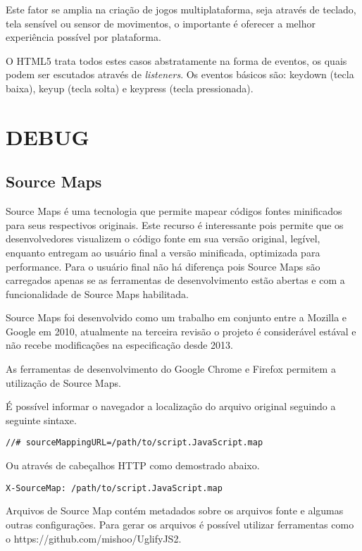 Este fator se amplia na criação de jogos multiplataforma,
seja através de teclado, tela sensível ou sensor de movimentos, o
importante é oferecer a melhor experiência possível por plataforma.

O HTML5 trata todos estes casos abstratamente na forma de eventos, os
quais podem ser escutados através de \textit{listeners}. Os eventos
básicos são: keydown (tecla baixa), keyup (tecla solta) e keypress
(tecla pressionada).
\section{DEBUG}

\subsection{Source Maps}

Source Maps é uma tecnologia que permite mapear códigos fontes
minificados para seus respectivos originais. Este recurso é
interessante pois permite que os desenvolvedores visualizem o código
fonte em sua versão original, legível, enquanto entregam ao usuário
final a versão minificada, optimizada para performance.
Para o usuário final não há diferença pois Source Maps são
carregados apenas se as ferramentas de desenvolvimento estão abertas e
com a funcionalidade de Source Maps habilitada.

Source Maps foi desenvolvido como um trabalho em conjunto entre a
Mozilla e Google em 2010, atualmente na terceira revisão o projeto é
considerável estával e não recebe modificações na especificação
desde 2013.

As ferramentas de desenvolvimento do Google Chrome e Firefox permitem a utilização de Source Maps.

É possível informar o navegador a localização do arquivo original seguindo a seguinte sintaxe.

\begin{verbatim}
//# sourceMappingURL=/path/to/script.JavaScript.map
\end{verbatim}

Ou através de cabeçalhos HTTP como demostrado abaixo.

\begin{verbatim}
X-SourceMap: /path/to/script.JavaScript.map
\end{verbatim}

Arquivos de Source Map contém metadados sobre os arquivos fonte e algumas outras configurações.
Para gerar os arquivos é possível utilizar ferramentas como o https://github.com/mishoo/UglifyJS2.

